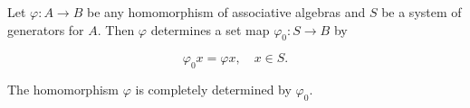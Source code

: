 Let $\varphi : A \rightarrow B$ be any homomorphism of associative algebras and $S$ be a system of generators for $A$. Then $\varphi$ determines a set map $\varphi_0 : S \rightarrow B$ by

$$\varphi_0 x = \varphi x, \quad x \in S.$$

The homomorphism $\varphi$ is completely determined by $\varphi_0$.
